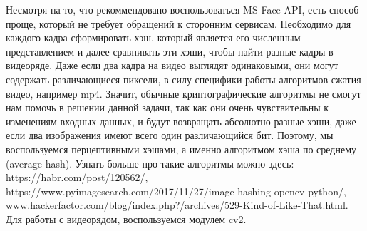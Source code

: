 \solutionSection

Несмотря на то, что рекоммендовано воспользоваться MS Face API, есть способ проще, который не требует обращений к сторонним сервисам.
Необходимо для каждого кадра сформировать хэш, который является его численным представлением и далее сравнивать эти хэши, чтобы найти разные кадры в видеоряде.
Даже если два кадра на видео выглядят одинаковыми, они могут содержать различающиеся пиксели, в силу специфики работы алгоритмов сжатия видео, например mp4. Значит, обычные криптографические алгоритмы не смогут нам помочь в решении данной задачи, так как они очень чувствительны к изменениям входных данных, и будут возвращать абсолютно разные хэши, даже если два изображения имеют всего один различающийся бит.
Поэтому, мы воспользуемся перцептивными хэшами, а именно алгоритмом хэша по среднему (average hash). Узнать больше про такие алгоритмы можно здесь: https://habr.com/post/120562/, https://www.pyimagesearch.com/2017/11/27/image-hashing-opencv-python/, www.hackerfactor.com/blog/index.php?/archives/529-Kind-of-Like-That.html.
Для работы с видеорядом, воспользуемся модулем cv2.

\codeExample

